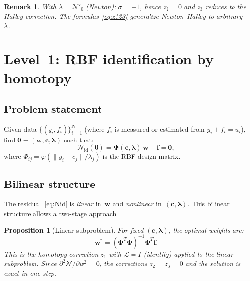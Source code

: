 \documentclass[11pt,a4paper]{article}
\newtheorem{proposition}[theorem]{Proposition}
\newtheorem{remark}[theorem]{Remark}
\begin{document}
\begin{remark}
With $\lambda = \mathcal{N}'_0$ (Newton): $\sigma = -1$, hence $z_2 = 0$ and $z_3$ reduces to the Halley correction. The formulas~\eqref{eq:z123} generalize Newton--Halley to arbitrary~$\lambda$.
\end{remark}


\section{Level~1: RBF identification by homotopy}
\label{sec:identification}

\subsection{Problem statement}

Given data $\{(y_i, f_i)\}_{i=1}^N$ (where $f_i$ is measured or estimated from $\dot{y}_i + f_i = u_i$), find $\boldsymbol{\theta} = (\mathbf{w}, \mathbf{c}, \boldsymbol{\lambda})$ such that:
\begin{equation}
\mathcal{N}_{\mathrm{id}}(\boldsymbol{\theta}) = \boldsymbol{\Phi}(\mathbf{c}, \boldsymbol{\lambda})\,\mathbf{w} - \mathbf{f} = \mathbf{0},
\label{eq:Nid}
\end{equation}
where $\Phi_{ij} = \varphi(\|y_i - c_j\|/\lambda_j)$ is the RBF design matrix.

\subsection{Bilinear structure}

The residual~\eqref{eq:Nid} is \emph{linear} in~$\mathbf{w}$ and \emph{nonlinear} in~$(\mathbf{c}, \boldsymbol{\lambda})$. This bilinear structure allows a two-stage approach.

\begin{proposition}[Linear subproblem]\label{prop:linear}
For fixed $(\mathbf{c}, \boldsymbol{\lambda})$, the optimal weights are:
\begin{equation}
\mathbf{w}^* = (\boldsymbol{\Phi}^T\boldsymbol{\Phi})^{-1}\boldsymbol{\Phi}^T\mathbf{f}.
\label{eq:ls}
\end{equation}
This is the homotopy correction $z_1$ with $\mathcal{L} = I$ (identity) applied to the linear subproblem. Since $\partial^2\mathcal{N}/\partial w^2 = 0$, the corrections $z_2 = z_3 = 0$ and the solution is exact in one step.
\end{proposition}
\end{document}
